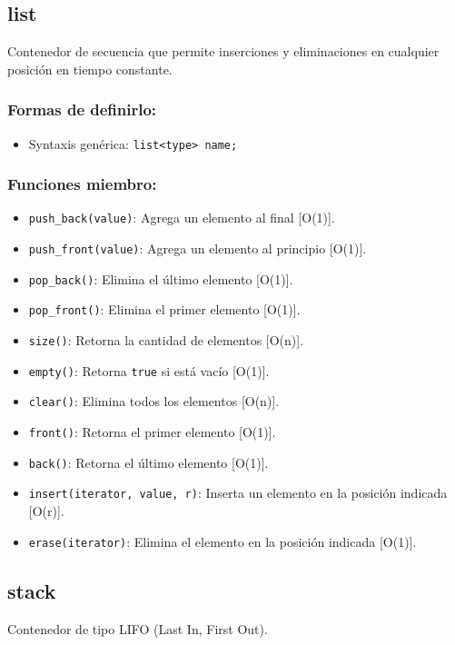 \subsection{list}
\label{subsec:std_list}
Contenedor de secuencia que permite inserciones y eliminaciones en cualquier posición en tiempo constante. 

\subsubsection{Formas de definirlo:}
\begin{itemize}
  \item Syntaxis genérica: \texttt{list<type> name;}
\end{itemize}

\subsubsection{Funciones miembro:}
\begin{itemize}
  \item \texttt{push\_back(value)}: Agrega un elemento al final [O(1)].
  \item \texttt{push\_front(value)}: Agrega un elemento al principio [O(1)].
  \item \texttt{pop\_back()}: Elimina el último elemento [O(1)].
  \item \texttt{pop\_front()}: Elimina el primer elemento [O(1)].
  \item \texttt{size()}: Retorna la cantidad de elementos [O(n)].
  \item \texttt{empty()}: Retorna \texttt{true} si está vacío [O(1)].
  \item \texttt{clear()}: Elimina todos los elementos [O(n)].
  \item \texttt{front()}: Retorna el primer elemento [O(1)].
  \item \texttt{back()}: Retorna el último elemento [O(1)].
  \item \texttt{insert(iterator, value, r)}: Inserta un elemento en la posición indicada [O(r)].
  \item \texttt{erase(iterator)}: Elimina el elemento en la posición indicada [O(1)]. 
\end{itemize}

\subsection{stack}
\label{subsec:std_stack}
Contenedor de tipo LIFO (Last In, First Out). 

